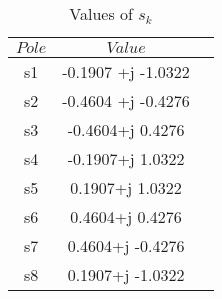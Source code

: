 \begin{table}[H]
    \centering
    \begin{tabular}{|c|c|c|}
        \hline
        \textbf{$Pole$} & \textbf{$Value$}   \\ \hline
        s1              & -0.1907 +j -1.0322 \\ \hline
        s2              & -0.4604 +j -0.4276 \\ \hline
        s3              & -0.4604+j 0.4276   \\ \hline
        s4              & -0.1907+j 1.0322   \\ \hline
        s5              & 0.1907+j 1.0322    \\ \hline
        s6              & 0.4604+j 0.4276    \\ \hline
        s7              & 0.4604+j -0.4276   \\ \hline
        s8              & 0.1907+j -1.0322   \\ \hline
    \end{tabular}
    \caption{Values of $s_k$}
    \label{tab:values poles sk}
\end{table}